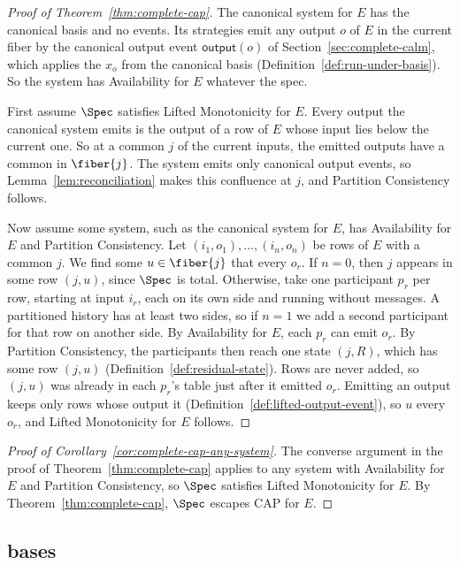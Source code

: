 \begin{proof}[Proof of Theorem~\ref{thm:complete-cap}]
The canonical system for $E$ has the canonical basis and no \commitment
events.  Its strategies emit any output $o$ of $E$ in the current fiber by
the canonical output event $\mathsf{output}(o)$ of
Section~\ref{sec:complete-calm}, which applies the \commitment $x_o$ from the
canonical basis (Definition~\ref{def:run-under-basis}).  So the system has
Availability for $E$ whatever the spec.

First assume $\Spec$ satisfies Lifted Monotonicity for $E$.  Every output the
canonical system emits is the output of a row of $E$ whose input lies below
the current one.  So at a common \indesc $j$ of the current inputs, the
emitted outputs have a common \outnoun in $\fiber{j}$.  The system emits only
canonical output events, so Lemma~\ref{lem:reconciliation} makes this
confluence at $j$, and Partition Consistency follows.

Now assume some system, such as the canonical system for $E$, has
Availability for $E$ and Partition Consistency.  Let
$(i_1,o_1),\ldots,(i_n,o_n)$ be rows of $E$ with a common \indesc $j$.  We
find some $u\in\fiber{j}$ that \outrel every $o_r$.  If $n=0$, then $j$
appears in some row $(j,u)$, since $\Spec$ is total.  Otherwise, take one
participant $p_r$ per row, starting at input $i_r$, each on its own side and
running without messages.  A partitioned history has at least two sides, so if
$n=1$ we add a second participant for that row on another side.  By
Availability for $E$, each $p_r$ can emit $o_r$.  By Partition Consistency,
the participants then reach one state $(j,R)$, which has some row $(j,u)$
(Definition~\ref{def:residual-state}).  Rows are never added, so $(j,u)$ was
already in each $p_r$'s table just after it emitted $o_r$.  Emitting an output
keeps only rows whose output \outrel it
(Definition~\ref{def:lifted-output-event}), so $u$ \outrel every $o_r$, and
Lifted Monotonicity for $E$ follows.
\end{proof}

\begin{proof}[Proof of Corollary~\ref{cor:complete-cap-any-system}]
The converse argument in the proof of Theorem~\ref{thm:complete-cap} applies
to any system with Availability for $E$ and Partition Consistency, so $\Spec$
satisfies Lifted Monotonicity for $E$.  By Theorem~\ref{thm:complete-cap},
$\Spec$ escapes CAP for $E$.
\end{proof}

\subsection{\Commitment bases}
\label{app:bases}\label{app:commitment-bases}

